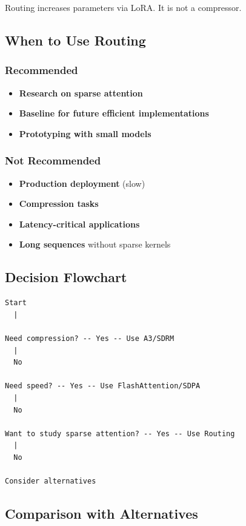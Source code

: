 Routing increases parameters via LoRA. It is not a compressor.

\subsection{When to Use Routing}

\subsubsection{Recommended}

\begin{itemize}
\item \textbf{Research on sparse attention}
\item \textbf{Baseline for future efficient implementations}
\item \textbf{Prototyping with small models}

\end{itemize}
\subsubsection{Not Recommended}

\begin{itemize}
\item \textbf{Production deployment} (slow)
\item \textbf{Compression tasks}
\item \textbf{Latency-critical applications}
\item \textbf{Long sequences} without sparse kernels

\end{itemize}
\subsection{Decision Flowchart}

\begin{lstlisting}
Start
  |
   
Need compression? -- Yes -- Use A3/SDRM
  |
  No
   
Need speed? -- Yes -- Use FlashAttention/SDPA
  |
  No
   
Want to study sparse attention? -- Yes -- Use Routing
  |
  No
   
Consider alternatives
\end{lstlisting}

\subsection{Comparison with Alternatives}

